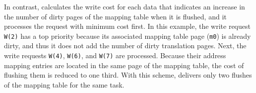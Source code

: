 In contrast, \ours{} calculates the write cost for each data that indicates an
increase in the number of dirty pages of the mapping table when it is flushed,
and it processes the request with minimum cost first.  In this example, the
write request \texttt{W(2)} has a top priority because its associated mapping
table page (\texttt{m0}) is already dirty, and thus it does not add the number of dirty
translation pages.  Next, the write requests \texttt{W(4)},
\texttt{W(6)}, and \texttt{W(7)} are processed.  Because their address mapping
entries are located in the same page of the mapping table, the cost of flushing
them is reduced to one third.  With this scheme, \ours{}
delivers only two flushes of the mapping table for the same task. 

\iffalse

